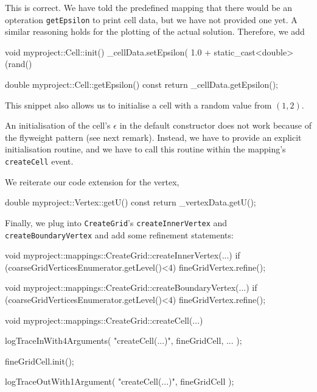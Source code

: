 \noindent
This is correct. 
We have told the predefined mapping that there would be an opteration
\texttt{getEpsilon} to print cell data, but we have not provided one yet.
A similar reasoning holds for the plotting of the actual solution.
Therefore, we add 

\begin{code}
void myproject::Cell::init() {
  _cellData.setEpsilon( 1.0 + static_cast<double>(rand() %
}

double myproject::Cell::getEpsilon() const {
  return _cellData.getEpsilon();
}
\end{code}

\noindent
This snippet also allows us to initialise a cell with a random value from
$(1,2)$.


\begin{remark}
An initialisation of the cell's $\epsilon$ in the default constructor does not
work because of the flyweight pattern (see next remark). Instead, we have to
provide an explicit initialisation routine, and we have to call this routine
within the mapping's \texttt{createCell} event.
\end{remark}

\noindent
We reiterate our code extension for the vertex,

\begin{code}
double myproject::Vertex::getU() const {
  return _vertexData.getU();
}
\end{code}

\noindent
Finally, we plug into \texttt{CreateGrid}'s \texttt{createInnerVertex} and
\texttt{createBoundaryVertex} and add some refinement statements:

\begin{code}
void myproject::mappings::CreateGrid::createInnerVertex(...) {
 if (coarseGridVerticesEnumerator.getLevel()<4) {
  fineGridVertex.refine();
 }
} 
 
void myproject::mappings::CreateGrid::createBoundaryVertex(...) {
 if (coarseGridVerticesEnumerator.getLevel()<4) {
  fineGridVertex.refine();
 }
} 
 
void myproject::mappings::CreateGrid::createCell(...) {
 logTraceInWith4Arguments( "createCell(...)", fineGridCell, ... );

 fineGridCell.init();

 logTraceOutWith1Argument( "createCell(...)", fineGridCell );
}
  
\end{code}


